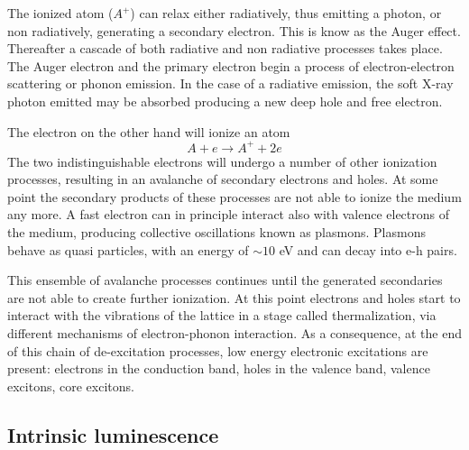 The ionized atom ($A^{+}$) can relax either radiatively, thus emitting a photon, or non radiatively, generating a secondary electron. This is know as the Auger effect. Thereafter a cascade of both radiative and non radiative processes takes place.
The Auger electron and the primary electron begin a process of electron-electron scattering or phonon emission. In the case of a radiative emission, the soft X-ray photon emitted may be absorbed producing a new deep hole and free electron. 

The electron on the other hand will ionize an atom
\begin{equation}
A + e \rightarrow A^{+} + 2e
\end{equation}
The two indistinguishable electrons will undergo a number of other ionization processes, resulting in an avalanche of secondary electrons and holes. At some point the secondary products of these processes are not able to ionize the medium any more.
A fast electron can in principle interact also with valence electrons of the medium, producing collective oscillations known as plasmons. Plasmons behave as quasi particles, with an energy of $\sim 10$ eV and can decay into e-h pairs.

This ensemble of avalanche processes continues until the generated secondaries are not able to create further ionization. At this point electrons and holes start to interact with the vibrations of the lattice in a stage called thermalization, via different mechanisms of electron-phonon interaction. 
As a consequence, at the end of this chain of de-excitation processes, low energy electronic excitations are present: electrons in the conduction band, holes in the valence band, valence excitons, core excitons.
 
\subsection{Intrinsic luminescence}

